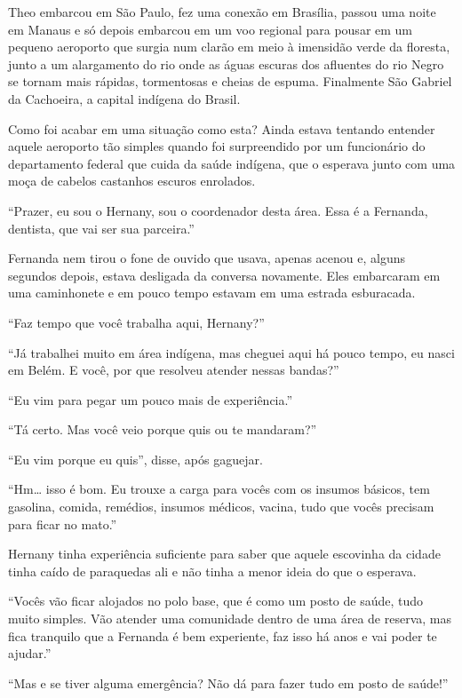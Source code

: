 \asterisc

Theo embarcou em São Paulo, fez uma conexão em Brasília, passou uma
noite em Manaus e só depois embarcou em um voo regional para pousar em
um pequeno aeroporto que surgia num clarão em meio à imensidão verde da
floresta, junto a um alargamento do rio onde as águas escuras dos
afluentes do rio Negro se tornam mais rápidas, tormentosas e cheias de
espuma. Finalmente São Gabriel da Cachoeira, a capital indígena do
Brasil.

Como foi acabar em uma situação como esta? Ainda estava tentando
entender aquele aeroporto tão simples quando foi surpreendido por um
funcionário do departamento federal que cuida da saúde indígena, que o
esperava junto com uma moça de cabelos castanhos escuros enrolados.

``Prazer, eu sou o Hernany, sou o coordenador desta área. Essa é a
Fernanda, dentista, que vai ser sua parceira.''

Fernanda nem tirou o fone de ouvido que usava, apenas acenou e, alguns
segundos depois, estava desligada da conversa novamente. Eles embarcaram
em uma caminhonete e em pouco tempo estavam em uma estrada esburacada.

``Faz tempo que você trabalha aqui, Hernany?''

``Já trabalhei muito em área indígena, mas cheguei aqui há pouco tempo,
eu nasci em Belém. E você, por que resolveu atender nessas bandas?''

``Eu vim para pegar um pouco mais de experiência.''

``Tá certo. Mas você veio porque quis ou te mandaram?''

``Eu vim porque eu quis'', disse, após gaguejar.

``Hm\ldots{} isso é bom. Eu trouxe a carga para vocês com os insumos
básicos, tem gasolina, comida, remédios, insumos médicos, vacina, tudo
que vocês precisam para ficar no mato.''

Hernany tinha experiência suficiente para saber que aquele escovinha da
cidade tinha caído de paraquedas ali e não tinha a menor ideia do que o
esperava.

``Vocês vão ficar alojados no polo base, que é como um posto de saúde,
tudo muito simples. Vão atender uma comunidade dentro de uma área de
reserva, mas fica tranquilo que a Fernanda é bem experiente, faz isso há
anos e vai poder te ajudar.''

``Mas e se tiver alguma emergência? Não dá para fazer tudo em posto de
saúde!''

